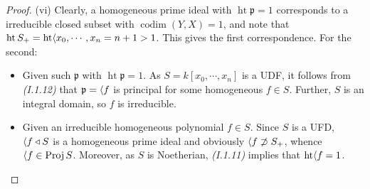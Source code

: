 \documentclass[11pt,a4paper,footinclude=true,headinclude=true]{scrbook} %
\DeclareMathOperator{\Ht}{ht}
\DeclareMathOperator{\Proj}{Proj}
\DeclareMathOperator{\codim}{codim}
\newcommand{\pp}{\mathfrak{p}}
\newcommand{\<}{\langle}
\let\>\relax
\newcommand{\>}{\rangle}
\begin{document}
\begin{proof}
    (vi) Clearly, a homogeneous prime ideal with $\Ht\pp=1$ corresponds to a irreducible closed subset with $\codim(Y,X)=1$, and note that $\Ht S_+=\Ht\<x_0,\cdots,x_n\>=n+1>1$. This gives the first correspondence. For the second:
    \begin{itemize}
        \item Given such $\pp$ with $\Ht\pp=1$. As $S=k[x_0,\cdots,x_n]$ is a UDF, it follows from \textit{(I.1.12)} that $\pp=\<f\>$ is principal for some homogeneous $f\in S$. Further, $S$ is an integral domain, so $f$ is irreducible.
        \item Given an irreducible homogeneous polynomial $f\in S$. Since $S$ is a UFD, $\<f\>\triangleleft S$ is a homogeneous prime ideal and obviously $\<f\>\not\supset S_+$, whence $\<f\>\in\Proj S$. Moreover, as $S$ is Noetherian, \textit{(I.1.11)} implies that $\Ht\<f\>=1$.
    \end{itemize}
\end{proof}
\end{document}
